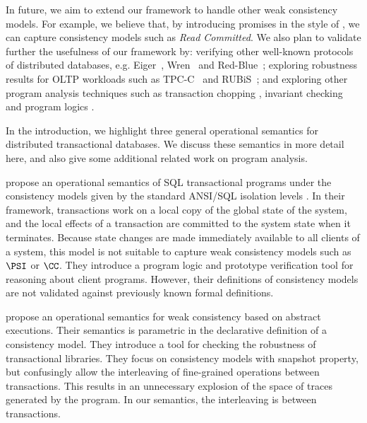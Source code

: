 In future, we aim to extend our framework to handle other 
weak consistency models. For example, we believe that, by introducing promises 
in the style of \cite{promises}, we can capture  consistency models such 
as \emph{Read Committed}. We also plan to validate further the usefulness of our framework
by: verifying other well-known protocols of 
distributed databases, e.g. Eiger~\cite{eiger}, Wren~\cite{wren} and
Red-Blue~\cite{redblue};  exploring robustness results for OLTP
workloads  such as TPC-C~\cite{tpcc} and RUBiS~\cite{rubis}; 
and exploring other program analysis techniques such as 
transaction chopping \cite{chopping,psi-chopping}, invariant checking 
\cite{cise,repliss} and program logics \cite{alonetogether}. 

In the introduction, we highlight three general operational semantics for 
distributed transactional databases. We discuss these semantics in more detail here,
and also give some additional related work on program analysis. 

\citet{alonetogether} propose an operational semantics of SQL transactional programs 
under the consistency models given by the standard ANSI/SQL isolation levels \cite{si}.
In their  framework, transactions work on a local copy of the global state 
of the system, and the local effects of a transaction are committed to the  
system state when it terminates. Because state changes 
are made immediately available to all clients of a system, this model 
is not suitable to capture weak consistency models such as \(\PSI\) or \(\CC\). 
They introduce a program logic and prototype verification tool for reasoning 
about client programs. However, their definitions of consistency models 
are not validated against previously known 
formal definitions.

\citet{sureshConcur} propose an operational semantics for weak consistency 
based on abstract executions. Their semantics 
is parametric in the declarative definition of a consistency model. 
They introduce a tool for checking the robustness of transactional  
libraries.
They focus on consistency models with snapshot property, but confusingly allow 
the interleaving of fine-grained operations between transactions. 
This results in an unnecessary explosion of the space of traces generated by 
the program. In our semantics, the interleaving is between transactions.

